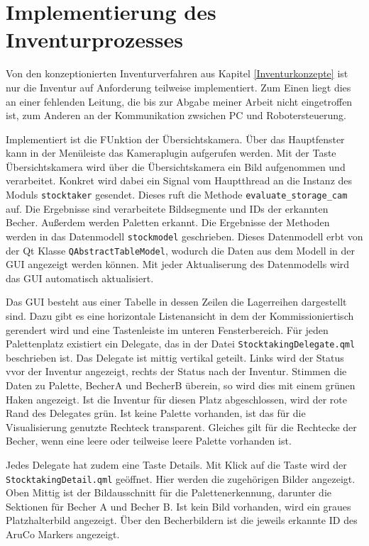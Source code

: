 \chapter{Implementierung des Inventurprozesses}

Von den konzeptionierten Inventurverfahren aus Kapitel \ref{Inventurkonzepte} ist nur die Inventur auf Anforderung teilweise implementiert. 
Zum Einen liegt dies an einer fehlenden Leitung, die bis zur Abgabe meiner Arbeit nicht eingetroffen ist,
zum Anderen an der Kommunikation zwsichen PC und Robotersteuerung. 

Implementiert ist die FUnktion der Übersichtskamera. 
Über das Hauptfenster kann in der Menüleiste das Kameraplugin aufgerufen werden. Mit der Taste \glq Übersichtskamera\grq{} wird über die Übersichtskamera ein Bild aufgenommen und verarbeitet. 
Konkret wird dabei ein Signal vom Hauptthread an die Instanz des Moduls \verb|stocktaker| gesendet. 
Dieses ruft die Methode \verb|evaluate_storage_cam| auf. Die Ergebnisse sind verarbeitete Bildsegmente und IDs der erkannten Becher.
Außerdem werden Paletten erkannt. 
Die Ergebnisse der Methoden werden in das Datenmodell \verb|stockmodel| geschrieben. 
Dieses Datenmodell erbt von der Qt Klasse \verb|QAbstractTableModel|, wodurch die Daten aus dem Modell in der GUI angezeigt werden können.
Mit jeder Aktualiserung des Datenmodells wird das GUI automatisch aktualisiert.

Das GUI besteht aus einer Tabelle in dessen Zeilen die Lagerreihen dargestellt sind.
Dazu gibt es eine horizontale Listenansicht in dem der Kommissioniertisch gerendert wird und eine Tastenleiste im unteren Fensterbereich. 
Für jeden Palettenplatz existiert ein Delegate, das in der Datei \verb|StocktakingDelegate.qml| beschrieben ist.
Das Delegate ist mittig vertikal geteilt. Links wird der Status vvor der Inventur angezeigt, rechts der Status nach der Inventur.
Stimmen die Daten zu Palette, BecherA und BecherB überein, so wird dies mit einem grünen Haken angezeigt.
Ist die Inventur für diesen Platz abgeschlossen, wird der rote Rand des Delegates grün. 
Ist keine Palette vorhanden, ist das für die Visualisierung genutzte Rechteck transparent. 
Gleiches gilt für die Rechtecke der Becher, wenn eine leere oder teilweise leere Palette vorhanden ist.

Jedes Delegate hat zudem eine Taste \glq Details\grq{}. Mit Klick auf die Taste wird der \\
\verb|StocktakingDetail.qml| geöffnet.
Hier werden die zugehörigen Bilder angezeigt.
Oben Mittig ist der Bildausschnitt für die Palettenerkennung, darunter die Sektionen für Becher A und Becher B. 
Ist kein Bild vorhanden, wird ein graues Platzhalterbild angezeigt.
Über den Becherbildern ist die jeweils erkannte ID des AruCo Markers angezeigt.

